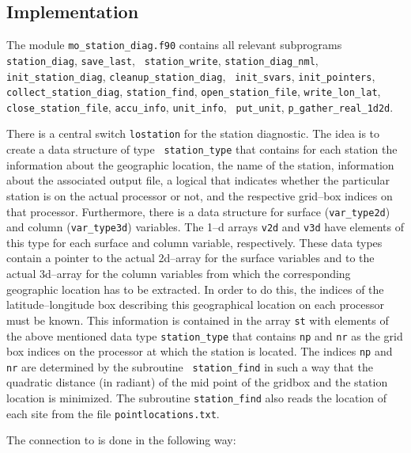 \begin{appendix}
\subsection{Implementation}

The module {\tt mo\_station\_diag.f90} contains all relevant
subprograms {\tt station\_diag}, {\tt save\_last}, {\tt
  station\_write}, {\tt station\_diag\_nml}, {\tt
  init\_station\_diag}, {\tt cleanup\_station\_diag}, {\tt
  init\_svars}, {\tt init\_pointers}, {\tt collect\_station\_diag},
{\tt station\_find}, {\tt open\_station\_file}, {\tt write\_lon\_lat},
{\tt close\_station\_file}, {\tt accu\_info}, {\tt unit\_info}, {\tt
  put\_unit}, {\tt p\_gather\_real\_1d2d}.

There is a central switch {\tt lostation} for the station
diagnostic. The idea is to create a data structure of type {\tt
  station\_type} that contains for each station the information about the
geographic location, the name of the station, information about the
associated output file, a logical that indicates whether the
particular station is on the actual processor or not, and the
respective grid--box indices on that processor. Furthermore,
there is a data structure for surface ({\tt var\_type2d}) and column
({\tt var\_type3d}) variables. The
1--d arrays {\tt v2d} and {\tt v3d} have elements of this type for
each surface and column variable, respectively. These data types
contain a pointer to the actual 2d--array for the surface variables
and to the actual 3d--array for the column variables from which the
corresponding geographic location has to be extracted. In order to do
this, the indices of the latitude--longitude box describing this
geographical location on each processor must be known. This information
is contained in the array {\tt st} with elements of the above
mentioned data type 
{\tt station\_type} that contains {\tt np} and {\tt nr} as the grid
box indices on the processor at which the station is located. The
indices {\tt np} and {\tt nr} are determined by the subroutine {\tt
  station\_find} in such a way that the quadratic distance (in
radiant) of the mid point of the gridbox and the station location is
minimized. The subroutine {\tt station\_find} also reads the location
of each site from the file {\tt pointlocations.txt}.

The connection to \echam{} is done in the following way:


\end{appendix}
